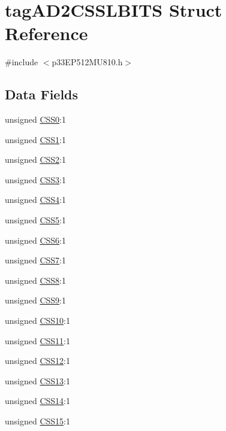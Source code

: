 \hypertarget{structtag_a_d2_c_s_s_l_b_i_t_s}{}\section{tag\+A\+D2\+C\+S\+S\+L\+B\+I\+TS Struct Reference}
\label{structtag_a_d2_c_s_s_l_b_i_t_s}


{\ttfamily \#include $<$p33\+E\+P512\+M\+U810.\+h$>$}

\subsection*{Data Fields}
\begin{DoxyCompactItemize}
\item 
unsigned \hyperlink{structtag_a_d2_c_s_s_l_b_i_t_s_a550f89b8e78dc062f9f5e2f6a3e01778}{C\+S\+S0}\+:1
\item 
unsigned \hyperlink{structtag_a_d2_c_s_s_l_b_i_t_s_a855cc1eab1422768412432673c038cc1}{C\+S\+S1}\+:1
\item 
unsigned \hyperlink{structtag_a_d2_c_s_s_l_b_i_t_s_a9d805aae2fa4e59ac0922b43397c949d}{C\+S\+S2}\+:1
\item 
unsigned \hyperlink{structtag_a_d2_c_s_s_l_b_i_t_s_a76e426ad4aabbc1b95338627a23ae9eb}{C\+S\+S3}\+:1
\item 
unsigned \hyperlink{structtag_a_d2_c_s_s_l_b_i_t_s_a9a9ff2d43720193ba5aec19dbd443d6a}{C\+S\+S4}\+:1
\item 
unsigned \hyperlink{structtag_a_d2_c_s_s_l_b_i_t_s_adb5659778b6f4209b5d2b3668da9fdd1}{C\+S\+S5}\+:1
\item 
unsigned \hyperlink{structtag_a_d2_c_s_s_l_b_i_t_s_acf633c5953f249ad867a0b8adff4d1c3}{C\+S\+S6}\+:1
\item 
unsigned \hyperlink{structtag_a_d2_c_s_s_l_b_i_t_s_ac59b9f66449f06f7d7db89eca887acec}{C\+S\+S7}\+:1
\item 
unsigned \hyperlink{structtag_a_d2_c_s_s_l_b_i_t_s_a867408da1e20ee0ab6e6d649393df325}{C\+S\+S8}\+:1
\item 
unsigned \hyperlink{structtag_a_d2_c_s_s_l_b_i_t_s_a17176813a1966557c22aa21e3d2df8d8}{C\+S\+S9}\+:1
\item 
unsigned \hyperlink{structtag_a_d2_c_s_s_l_b_i_t_s_abe45970478bbe918c58abfc7552ce363}{C\+S\+S10}\+:1
\item 
unsigned \hyperlink{structtag_a_d2_c_s_s_l_b_i_t_s_aae98a27d4f3f2eb23d9b1793d0f2da2c}{C\+S\+S11}\+:1
\item 
unsigned \hyperlink{structtag_a_d2_c_s_s_l_b_i_t_s_a0f0fd17721b012765db8371a457e8a8f}{C\+S\+S12}\+:1
\item 
unsigned \hyperlink{structtag_a_d2_c_s_s_l_b_i_t_s_afbda5ef77af60d2965cd7079f099f89d}{C\+S\+S13}\+:1
\item 
unsigned \hyperlink{structtag_a_d2_c_s_s_l_b_i_t_s_a89250af994a2b9a7759f36e15b8c41b8}{C\+S\+S14}\+:1
\item 
unsigned \hyperlink{structtag_a_d2_c_s_s_l_b_i_t_s_adde564d938af376e76a2d400e47ba78e}{C\+S\+S15}\+:1
\end{DoxyCompactItemize}


